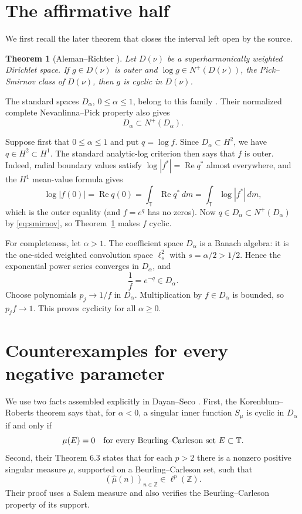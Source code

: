 \documentclass[11pt]{article}
\newtheorem{theorem}{Theorem}
\newcommand{\T}{\mathbb T}
\begin{document}
\section{The affirmative half}

We first recall the later theorem that closes the interval left open by the
source.

\begin{theorem}[Aleman--Richter \cite{AR}]\label{thm:AR}
Let $D(\nu)$ be a superharmonically weighted Dirichlet space.  If
$g\in D(\nu)$ is outer and
$\log g\in N^+(D(\nu))$, the Pick--Smirnov class of $D(\nu)$, then $g$ is
cyclic in $D(\nu)$.
\end{theorem}

The standard spaces $D_\alpha$, $0\leq\alpha\leq1$, belong to this family
\cite[Introduction]{AR}.  Their normalized complete Nevanlinna--Pick property
also gives
\begin{equation}\label{eq:smirnov}
 D_\alpha\subset N^+(D_\alpha).
\end{equation}

Suppose first that $0\leq\alpha\leq1$ and put $q=\log f$.  Since
$D_\alpha\subset H^2$, we have $q\in H^2\subset H^1$.  The standard
analytic-log criterion then says that $f$ is outer.  Indeed, radial boundary
values satisfy $\log|f^*|=\operatorname{Re}q^*$ almost everywhere, and the
$H^1$ mean-value formula gives
\[
 \log|f(0)|=\operatorname{Re}q(0)
 =\int_{\T}\operatorname{Re}q^*\,dm
 =\int_{\T}\log|f^*|\,dm,
\]
which is the outer equality (and $f=e^q$ has no zeros).  Now
$q\in D_\alpha\subset N^+(D_\alpha)$ by \eqref{eq:smirnov}, so
Theorem~\ref{thm:AR} makes $f$ cyclic.

For completeness, let $\alpha>1$.  The coefficient space $D_\alpha$ is a
Banach algebra: it is the one-sided weighted convolution space
$\ell^2_s$ with $s=\alpha/2>1/2$.  Hence the exponential power series
converges in $D_\alpha$, and
\[
 \frac1f=e^{-q}\in D_\alpha.
\]
Choose polynomials $p_j\to1/f$ in $D_\alpha$.  Multiplication by
$f\in D_\alpha$ is bounded, so $p_jf\to1$.  This proves cyclicity for all
$\alpha\geq0$.

\section{Counterexamples for every negative parameter}

We use two facts assembled explicitly in Dayan--Seco \cite{DS}.  First, the
Korenblum--Roberts theorem says that, for $\alpha<0$, a singular inner
function $S_\mu$ is cyclic in $D_\alpha$ if and only if
\begin{equation}\label{eq:KR}
 \mu(E)=0\quad\hbox{for every Beurling--Carleson set }E\subset\T.
\end{equation}
Second, their Theorem 6.3 states that for each $p>2$ there is a nonzero
positive singular measure $\mu$, supported on a Beurling--Carleson set, such
that
\begin{equation}\label{eq:lp}
 (\widehat\mu(n))_{n\in\mathbb Z}\in\ell^p(\mathbb Z).
\end{equation}
Their proof uses a Salem measure and also verifies the
Beurling--Carleson property of its support.
\end{document}
